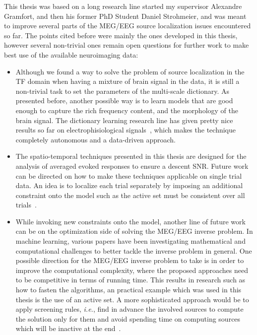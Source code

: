 This thesis was based on a long research line started my supervisor Alexandre Gramfort, and then his former PhD Student Daniel Strohmeier, and was meant to improve several parts of the MEG/EEG source localization issues encountered so far. The points cited before were mainly the ones developed in this thesis, however several non-trivial ones remain open questions for further work to make best use of the available neuroimaging data:
\begin{itemize}
\item Although we found a way to solve the problem of source localization in the TF domain when having a mixture of brain signal in the data, it is still a non-trivial task to set the parameters of the multi-scale dictionary. As presented before, another possible way is to learn models that are good enough to capture the rich frequency content, and the morphology of the brain signal. The dictionary learning research line has given pretty nice results so far on electrophisiological signals~\cite{jas2017learning,jost2006motif,brockmeier2016learning,hitziger2017adaptive}, which makes the technique completely autonomous and a data-driven approach.

\item The spatio-temporal techniques presented in this thesis are designed for the analysis of averaged evoked responses to ensure a descent SNR. Future work can be directed on how to make these techniques applicable on single trial data. An idea is to localize each trial separately by imposing an additional constraint onto the model such as the active set must be consistent over all trials~\cite{strohmeier2012meg,strohmeier2012biomag}.

\item While invoking new constraints onto the model, another line of future work can be on the optimization side of solving the MEG/EEG inverse problem. In machine learning, various papers have been investigating mathematical and computational challenges to better tackle the inverse problem in general. One possible direction for the MEG/EEG inverse problem to take is in order to improve the computational complexity, where the proposed approaches need to be competitive in terms of running time. This results in research such as how to fasten the algorithms, an practical example which was used in this thesis is the use of an active set. A more sophisticated approach would be to apply screening rules, \textit{i.e.}, find in advance the involved sources to compute the solution only for them and avoid spending time on computing sources which will be inactive at the end~\cite{fercoq-etal:2015,massias2017safe,massiasgap,ndiaye2016gap,ndiaye2017efficient}.


\end{itemize}
